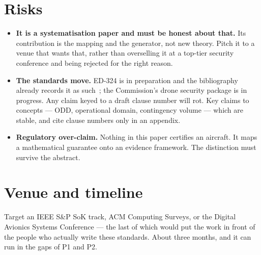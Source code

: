 \documentclass[11pt,a4paper]{article}
\begin{document}
\section{Risks}
\begin{itemize}
\item \textbf{It is a systematisation paper and must be honest about that.} Its
contribution is the mapping and the generator, not new theory. Pitch it to a
venue that wants that, rather than overselling it at a top-tier security
conference and being rejected for the right reason.
\item \textbf{The standards move.} ED-324 is in preparation and the
bibliography already records it as such~\cite{ed324}; the Commission's drone
security package is in progress. Any claim keyed to a draft clause number will
rot. Key claims to concepts --- ODD, operational domain, contingency volume ---
which are stable, and cite clause numbers only in an appendix.
\item \textbf{Regulatory over-claim.} Nothing in this paper certifies an
aircraft. It maps a mathematical guarantee onto an evidence framework. The
distinction must survive the abstract.
\end{itemize}

\section{Venue and timeline}
Target an IEEE S\&P SoK track, ACM Computing Surveys, or the Digital Avionics
Systems Conference --- the last of which would put the work in front of the
people who actually write these standards. About three months, and it can run in
the gaps of P1 and P2.

\small


\end{document}
